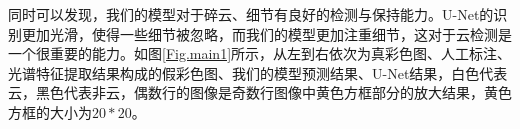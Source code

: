 \documentclass[10pt]{ctexart}
\begin{document}
\begin{multicols}{2}

同时可以发现，我们的模型对于碎云、细节有良好的检测与保持能力。U-Net的识别更加光滑，使得一些细节被忽略，而我们的模型更加注重细节，这对于云检测是一个很重要的能力。如图\ref{Fig.main1}所示，从左到右依次为真彩色图、人工标注、光谱特征提取结果构成的假彩色图、我们的模型预测结果、U-Net结果，白色代表云，黑色代表非云，偶数行的图像是奇数行图像中黄色方框部分的放大结果，黄色方框的大小为$20*20$。

\end{multicols}

\begin{figure}[H]
    \centering
\end{figure}
\end{document}
